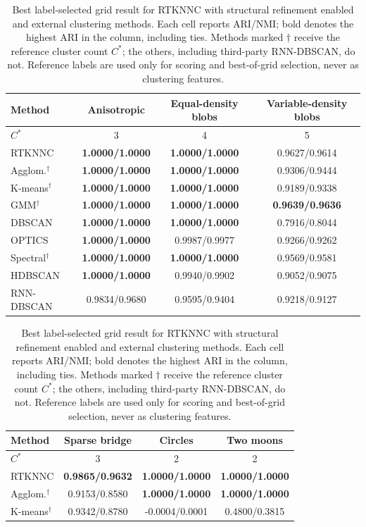 \documentclass[pdflatex,sn-basic,Numbered]{sn-jnl}
\begin{document}
\begin{table}[t]
\caption{Best label-selected grid result for RTKNNC with structural refinement enabled and
external clustering methods. Each cell reports ARI/NMI; bold denotes the
highest ARI in the column, including ties. Methods marked $\dagger$ receive the
reference cluster count $C^*$; the others, including third-party RNN-DBSCAN, do not. Reference labels are used
only for scoring and best-of-grid selection, never as clustering features.}
\label{tab:all_methods_comparison}
\centering
\small
\setlength{\tabcolsep}{4pt}
\begin{tabular}{@{}lccc@{}}
\toprule
Method & Anisotropic & Equal-density blobs & Variable-density blobs \\
\midrule
$C^*$ & 3 & 4 & 5 \\
\midrule
RTKNNC & \textbf{1.0000/1.0000} & \textbf{1.0000/1.0000} & 0.9627/0.9614 \\
Agglom.$^\dagger$ & \textbf{1.0000/1.0000} & \textbf{1.0000/1.0000} & 0.9306/0.9444 \\
K-means$^\dagger$ & \textbf{1.0000/1.0000} & \textbf{1.0000/1.0000} & 0.9189/0.9338 \\
GMM$^\dagger$ & \textbf{1.0000/1.0000} & \textbf{1.0000/1.0000} & \textbf{0.9639/0.9636} \\
DBSCAN & \textbf{1.0000/1.0000} & \textbf{1.0000/1.0000} & 0.7916/0.8044 \\
OPTICS & \textbf{1.0000/1.0000} & 0.9987/0.9977 & 0.9266/0.9262 \\
Spectral$^\dagger$ & \textbf{1.0000/1.0000} & \textbf{1.0000/1.0000} & 0.9569/0.9581 \\
HDBSCAN & \textbf{1.0000/1.0000} & 0.9940/0.9902 & 0.9052/0.9075 \\
RNN-DBSCAN & 0.9834/0.9680 & 0.9595/0.9404 & 0.9218/0.9127 \\
\bottomrule
\end{tabular}
\par\medskip
\begin{tabular}{@{}lccc@{}}
\toprule
Method & Sparse bridge & Circles & Two moons \\
\midrule
$C^*$ & 3 & 2 & 2 \\
\midrule
RTKNNC & \textbf{0.9865/0.9632} & \textbf{1.0000/1.0000} & \textbf{1.0000/1.0000} \\
Agglom.$^\dagger$ & 0.9153/0.8580 & \textbf{1.0000/1.0000} & \textbf{1.0000/1.0000} \\
K-means$^\dagger$ & 0.9342/0.8780 & -0.0004/0.0001 & 0.4800/0.3815 \\

\end{tabular}
\end{table}
\end{document}
